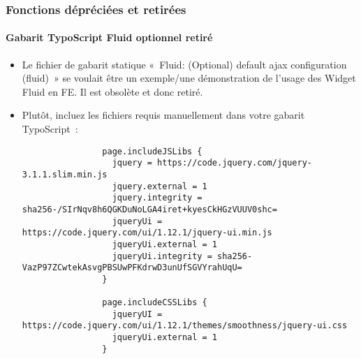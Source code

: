 \begin{frame}[fragile]
	\frametitle{Fonctions dépréciées et retirées}
	\framesubtitle{Gabarit TypoScript Fluid optionnel retiré}

	\lstset{basicstyle=\tiny\ttfamily}

	\begin{itemize}
		\item Le fichier de gabarit statique «~Fluid: (Optional) default
			ajax configuration (fluid)~» se voulait être un exemple/une démonstration de
			l'usage des Widget Fluid en FE. Il est obsolète et donc retiré.
		\item Plutôt, incluez les fichiers requis manuellement dans votre gabarit TypoScript~:

			\begin{lstlisting}
				page.includeJSLibs {
				  jquery = https://code.jquery.com/jquery-3.1.1.slim.min.js
				  jquery.external = 1
				  jquery.integrity = sha256-/SIrNqv8h6QGKDuNoLGA4iret+kyesCkHGzVUUV0shc=
				  jqueryUi = https://code.jquery.com/ui/1.12.1/jquery-ui.min.js
				  jqueryUi.external = 1
				  jqueryUi.integrity = sha256-VazP97ZCwtekAsvgPBSUwPFKdrwD3unUfSGVYrahUqU=
				}

				page.includeCSSLibs {
				  jqueryUI = https://code.jquery.com/ui/1.12.1/themes/smoothness/jquery-ui.css
				  jqueryUi.external = 1
				}
			\end{lstlisting}

	\end{itemize}

\end{frame}


